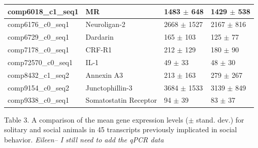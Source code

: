 \documentclass[10.5pt]{article}
\begin{document}
\begin{center}
\begin{longtable}{ | l | l | l | l | }
comp6018\_c1\_seq1	&	MR	&	1483	$\pm$	648	&	1429	$\pm$	538	\\ \hline
comp6176\_c0\_seq1	&	Neuroligan-2	&	2668	$\pm$	1527	&	2167	$\pm$	816	 \\ \hline
comp6729\_c0\_seq1	&	Dardarin	&	165	$\pm$	103	&	125	$\pm$	77	\\ \hline
comp7178\_c0\_seq1	&	CRF-R1	&	212	$\pm$	129	&	180	$\pm$	90	\\ \hline
comp72570\_c0\_seq1	&	IL-1	&	49	$\pm$	33	&	48	$\pm$	30	 \\ \hline
comp8432\_c1\_seq2	&	Annexin A3	&	213	$\pm$	163	&	279	$\pm$	267	 \\ \hline
comp9154\_c0\_seq2	&	Junctophillin-3	&	3684	$\pm$	1533	&	3139	$\pm$	849	\\ \hline
comp9338\_c0\_seq1	&	Somatostatin Receptor	&	94	$\pm$	39	&	83	$\pm$	37	 \\ \hline
\end{longtable}
\vspace{5mm}
\end{center}

\vspace{10mm}
\noindent
Table 3. A comparison of the mean gene expression levels ($\pm$ stand. dev.) for solitary and social animals in 45 transcripts previously implicated in social behavior.  \em{Eileen-- I still need to add the qPCR data} 
\end{document}
